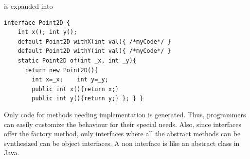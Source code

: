 \noindent is expanded into
\begin{lstlisting}
interface Point2D {
    int x(); int y();
    default Point2D withX(int val){ /*myCode*/ }
    default Point2D withY(int val){ /*myCode*/ }
    static Point2D of(int _x, int _y){
      return new Point2D(){
        int x=_x;    int y=_y;
        public int x(){return x;}
        public int y(){return y;} }; } }
\end{lstlisting}

\noindent Only code for methods needing implementation is generated. Thus,
programmers can easily customize the behaviour for their special needs.
Also, since \mixin interfaces offer the \Q@of@ factory method, only interfaces where all the abstract methods
can be synthesized can be object interfaces. A non \mixin interface is like an abstract class in Java.





%

